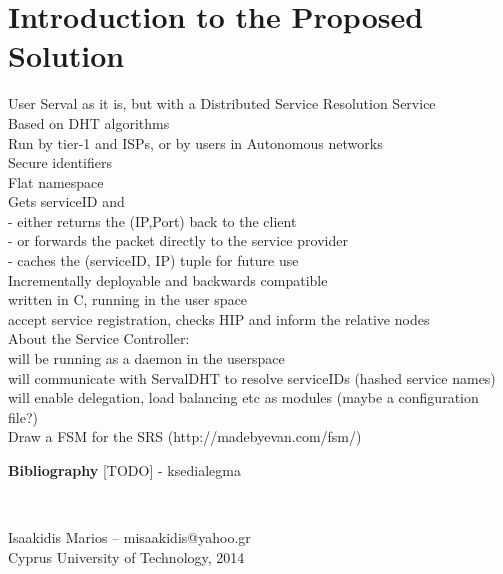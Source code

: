 \documentclass[12pt,a4paper,oneside]{article}
\begin{document}
\section{Introduction to the Proposed Solution}
User Serval as it is, but with a Distributed Service Resolution Service
\\Based on DHT algorithms
\\Run by tier-1 and ISPs, or by users in Autonomous networks
\\Secure identifiers
\\Flat namespace
\\Gets serviceID and
\\- either returns the (IP,Port) back to the client
\\- or forwards the packet directly to the service provider
\\- caches the (serviceID, IP) tuple for future use
\\Incrementally deployable and backwards compatible
\\written in C, running in the user space
\\accept service registration, checks HIP and inform the relative nodes
\\About the Service Controller:
\\will be running as a daemon in the userspace
\\will communicate with ServalDHT to resolve serviceIDs (hashed service names)
\\will enable delegation, load balancing etc as modules (maybe a configuration file?)
\\Draw a FSM for the SRS  (http://madebyevan.com/fsm/)



\newpage
{}
{}
{\Huge \bf \noindent Bibliography}
[TODO] - ksedialegma
\nocite{*}

\renewcommand{\refname}{}


\pagestyle{empty}
\label{sec:appendix}


\newpage
{}
\vspace*{\fill}
\hrulefill \\
\begin{center}
Isaakidis Marios -- misaakidis@yahoo.gr\\
Cyprus University of Technology, 2014
\end{center}
\end{document}
